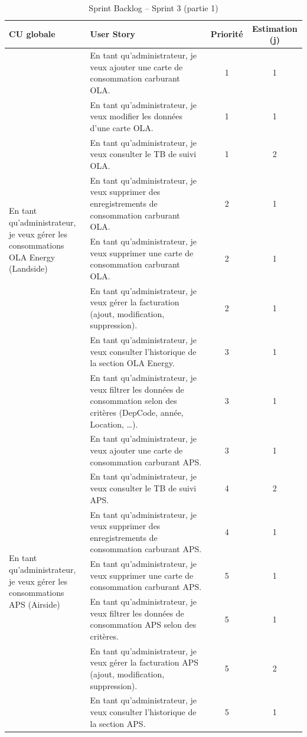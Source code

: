 \documentclass[a4paper,11pt]{report}
\begin{document}
\begin{table}[htbp]
  \centering
  \caption{Sprint Backlog – Sprint 3 (partie 1)}
  \label{tab:sprint3-backlog-part1}
  \begin{tabular}{|p{3.5cm}|p{8cm}|c|c|}
    \hline
    \textbf{CU globale} 
      & \textbf{User Story} 
      & \textbf{Priorité} 
      & \textbf{Estimation (j)} \\ 
    \hline
    \multirow{8}{=}{\parbox{3.5cm}{En tant qu’administrateur,\\je veux gérer les consommations\\OLA Energy (Landside)}} 
      & En tant qu'administrateur, je veux ajouter une carte de consommation carburant OLA. 
      & 1 & 1 \\ \cline{2-4}
    & En tant qu'administrateur, je veux modifier les données d’une carte OLA. 
      & 1 & 1 \\ \cline{2-4}
    & En tant qu'administrateur, je veux consulter le TB de suivi OLA. 
      & 1 & 2 \\ \cline{2-4}
    & En tant qu'administrateur, je veux supprimer des enregistrements de consommation carburant OLA. 
      & 2 & 1 \\ \cline{2-4}
    & En tant qu'administrateur, je veux supprimer une carte de consommation carburant OLA. 
      & 2 & 1 \\ \cline{2-4}
    & En tant qu'administrateur, je veux gérer la facturation (ajout, modification, suppression). 
      & 2 & 1 \\ \cline{2-4}
    & En tant qu'administrateur, je veux consulter l’historique de la section OLA Energy. 
      & 3 & 1 \\ \cline{2-4}
    & En tant qu'administrateur, je veux filtrer les données de consommation selon des critères (DepCode, année, Location, …). 
      & 3 & 1 \\
    \hline
    \multirow{7}{=}{\parbox{3.5cm}{En tant qu’administrateur,\\je veux gérer les consommations\\APS (Airside)}} 
      & En tant qu'administrateur, je veux ajouter une carte de consommation carburant APS. 
      & 3 & 1 \\ \cline{2-4}
    & En tant qu'administrateur, je veux consulter le TB de suivi APS. 
      & 4 & 2 \\ \cline{2-4}
    & En tant qu'administrateur, je veux supprimer des enregistrements de consommation carburant APS. 
      & 4 & 1 \\ \cline{2-4}
    & En tant qu'administrateur, je veux supprimer une carte de consommation carburant APS. 
      & 5 & 1 \\ \cline{2-4}
    & En tant qu'administrateur, je veux filtrer les données de consommation APS selon des critères. 
      & 5 & 1 \\ \cline{2-4}
    & En tant qu'administrateur, je veux gérer la facturation APS (ajout, modification, suppression). 
      & 5 & 2 \\ \cline{2-4}
    & En tant qu'administrateur, je veux consulter l’historique de la section APS. 
      & 5 & 1 \\
    \hline
  \end{tabular}
\end{table}
\end{document}
